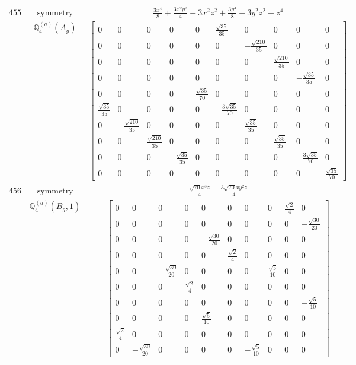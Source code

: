 \documentclass[fleqn,8pt,landscape]{jsarticle}
\begin{document}
\begin{longtable}{ccc}
$ 455 $ & $ \text{symmetry} $ & $ \frac{3 x^{4}}{8} + \frac{3 x^{2} y^{2}}{4} - 3 x^{2} z^{2} + \frac{3 y^{4}}{8} - 3 y^{2} z^{2} + z^{4} $ \\
$  $ & $ \mathbb{Q}_{4}^{(a)}(A_{g}) $ & $ \begin{bmatrix} 0 & 0 & 0 & 0 & 0 & \frac{\sqrt{35}}{35} & 0 & 0 & 0 & 0 \\ 0 & 0 & 0 & 0 & 0 & 0 & - \frac{\sqrt{210}}{35} & 0 & 0 & 0 \\ 0 & 0 & 0 & 0 & 0 & 0 & 0 & \frac{\sqrt{210}}{35} & 0 & 0 \\ 0 & 0 & 0 & 0 & 0 & 0 & 0 & 0 & - \frac{\sqrt{35}}{35} & 0 \\ 0 & 0 & 0 & 0 & \frac{\sqrt{35}}{70} & 0 & 0 & 0 & 0 & 0 \\ \frac{\sqrt{35}}{35} & 0 & 0 & 0 & 0 & - \frac{3 \sqrt{35}}{70} & 0 & 0 & 0 & 0 \\ 0 & - \frac{\sqrt{210}}{35} & 0 & 0 & 0 & 0 & \frac{\sqrt{35}}{35} & 0 & 0 & 0 \\ 0 & 0 & \frac{\sqrt{210}}{35} & 0 & 0 & 0 & 0 & \frac{\sqrt{35}}{35} & 0 & 0 \\ 0 & 0 & 0 & - \frac{\sqrt{35}}{35} & 0 & 0 & 0 & 0 & - \frac{3 \sqrt{35}}{70} & 0 \\ 0 & 0 & 0 & 0 & 0 & 0 & 0 & 0 & 0 & \frac{\sqrt{35}}{70} \end{bmatrix} $ \\ \hline
$ 456 $ & $ \text{symmetry} $ & $ \frac{\sqrt{70} x^{3} z}{4} - \frac{3 \sqrt{70} x y^{2} z}{4} $ \\
$  $ & $ \mathbb{Q}_{4}^{(a)}(B_{g},1) $ & $ \begin{bmatrix} 0 & 0 & 0 & 0 & 0 & 0 & 0 & 0 & \frac{\sqrt{2}}{4} & 0 \\ 0 & 0 & 0 & 0 & 0 & 0 & 0 & 0 & 0 & - \frac{\sqrt{30}}{20} \\ 0 & 0 & 0 & 0 & - \frac{\sqrt{30}}{20} & 0 & 0 & 0 & 0 & 0 \\ 0 & 0 & 0 & 0 & 0 & \frac{\sqrt{2}}{4} & 0 & 0 & 0 & 0 \\ 0 & 0 & - \frac{\sqrt{30}}{20} & 0 & 0 & 0 & 0 & \frac{\sqrt{5}}{10} & 0 & 0 \\ 0 & 0 & 0 & \frac{\sqrt{2}}{4} & 0 & 0 & 0 & 0 & 0 & 0 \\ 0 & 0 & 0 & 0 & 0 & 0 & 0 & 0 & 0 & - \frac{\sqrt{5}}{10} \\ 0 & 0 & 0 & 0 & \frac{\sqrt{5}}{10} & 0 & 0 & 0 & 0 & 0 \\ \frac{\sqrt{2}}{4} & 0 & 0 & 0 & 0 & 0 & 0 & 0 & 0 & 0 \\ 0 & - \frac{\sqrt{30}}{20} & 0 & 0 & 0 & 0 & - \frac{\sqrt{5}}{10} & 0 & 0 & 0 \end{bmatrix} $ \\ \hline

\end{longtable}
\end{document}
